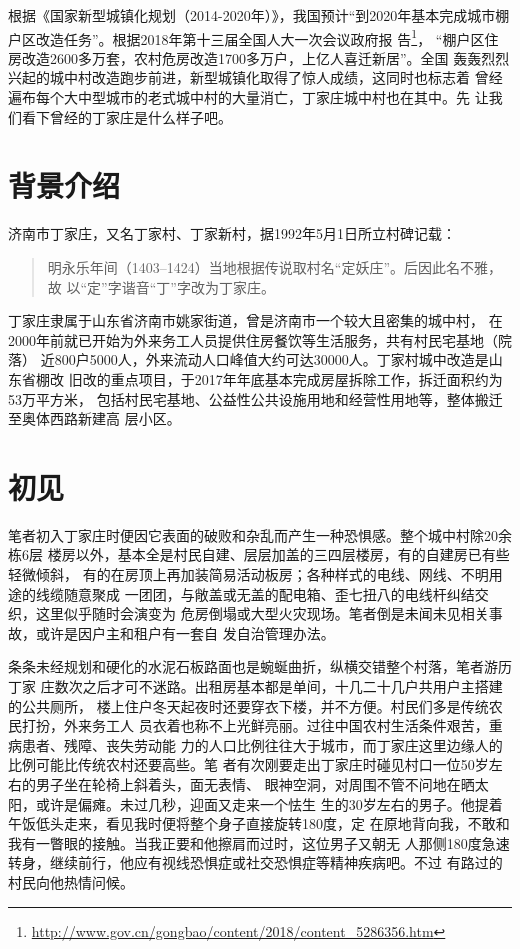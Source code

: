 根据《国家新型城镇化规划（2014-2020年）》，我国预计“到2020年基本完成城市棚
户区改造任务”。根据2018年第十三届全国人大一次会议政府报
告\footnote{\url{http://www.gov.cn/gongbao/content/2018/content_5286356.htm}}，
“棚户区住房改造2600多万套，农村危房改造1700多万户，上亿人喜迁新居”。全国
轰轰烈烈兴起的城中村改造跑步前进，新型城镇化取得了惊人成绩，这同时也标志着
曾经遍布每个大中型城市的老式城中村的大量消亡，丁家庄城中村也在其中。先
让我们看下曾经的丁家庄是什么样子吧。

\section{背景介绍}

济南市丁家庄，又名丁家村、丁家新村，据1992年5月1日所立村碑记载：
\begin{quotation}
  明永乐年间（1403--1424）当地根据传说取村名“定妖庄”。后因此名不雅，故
  以“定”字谐音“丁”字改为丁家庄。
\end{quotation}

丁家庄隶属于山东省济南市姚家街道，曾是济南市一个较大且密集的城中村，
在2000年前就已开始为外来务工人员提供住房餐饮等生活服务，共有村民宅基地（院落）
近800户5000人，外来流动人口峰值大约可达30000人。丁家村城中改造是山东省棚改
旧改的重点项目，于2017年年底基本完成房屋拆除工作，拆迁面积约为53万平方米，
包括村民宅基地、公益性公共设施用地和经营性用地等，整体搬迁至奥体西路新建高
层小区。

\section{初见}

笔者初入丁家庄时便因它表面的破败和杂乱而产生一种恐惧感。整个城中村除20余栋6层
楼房以外，基本全是村民自建、层层加盖的三四层楼房，有的自建房已有些轻微倾斜，
有的在房顶上再加装简易活动板房；各种样式的电线、网线、不明用途的线缆随意聚成
一团团，与敞盖或无盖的配电箱、歪七扭八的电线杆纠结交织，这里似乎随时会演变为
危房倒塌或大型火灾现场。笔者倒是未闻未见相关事故，或许是因户主和租户有一套自
发自治管理办法。

条条未经规划和硬化的水泥石板路面也是蜿蜒曲折，纵横交错整个村落，笔者游历丁家
庄数次之后才可不迷路。出租房基本都是单间，十几二十几户共用户主搭建的公共厕所，
楼上住户冬天起夜时还要穿衣下楼，并不方便。村民们多是传统农民打扮，外来务工人
员衣着也称不上光鲜亮丽。过往中国农村生活条件艰苦，重病患者、残障、丧失劳动能
力的人口比例往往大于城市，而丁家庄这里边缘人的比例可能比传统农村还要高些。笔
者有次刚要走出丁家庄时碰见村口一位50岁左右的男子坐在轮椅上斜着头，面无表情、
眼神空洞，对周围不管不问地在晒太阳，或许是偏瘫。未过几秒，迎面又走来一个怯生
生的30岁左右的男子。他提着午饭低头走来，看见我时便将整个身子直接旋转180度，定
在原地背向我，不敢和我有一瞥眼的接触。当我正要和他擦肩而过时，这位男子又朝无
人那侧180度急速转身，继续前行，他应有视线恐惧症或社交恐惧症等精神疾病吧。不过
有路过的村民向他热情问候。

